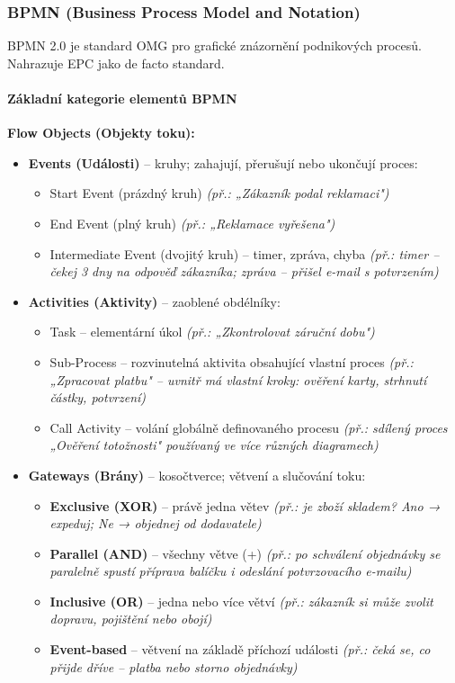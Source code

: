 \subsubsection{BPMN (Business Process Model and Notation)}

BPMN 2.0 je standard OMG pro grafické znázornění podnikových procesů. Nahrazuje EPC jako de facto standard.

\paragraph{Základní kategorie elementů BPMN}

\textbf{Flow Objects (Objekty toku):}
\begin{itemize}
  \item \textbf{Events (Události)} -- kruhy; zahajují, přerušují nebo ukončují proces:
    \begin{itemize}
      \item Start Event (prázdný kruh) \textit{(př.: „Zákazník podal reklamaci")}
      \item End Event (plný kruh) \textit{(př.: „Reklamace vyřešena")}
      \item Intermediate Event (dvojitý kruh) -- timer, zpráva, chyba \textit{(př.: timer -- čekej 3 dny na odpověď zákazníka; zpráva -- přišel e-mail s potvrzením)}
    \end{itemize}
  \item \textbf{Activities (Aktivity)} -- zaoblené obdélníky:
    \begin{itemize}
      \item Task -- elementární úkol \textit{(př.: „Zkontrolovat záruční dobu")}
      \item Sub-Process -- rozvinutelná aktivita obsahující vlastní proces \textit{(př.: „Zpracovat platbu" -- uvnitř má vlastní kroky: ověření karty, strhnutí částky, potvrzení)}
      \item Call Activity -- volání globálně definovaného procesu \textit{(př.: sdílený proces „Ověření totožnosti" používaný ve více různých diagramech)}
    \end{itemize}
  \item \textbf{Gateways (Brány)} -- kosočtverce; větvení a slučování toku:
    \begin{itemize}
      \item \textbf{Exclusive (XOR)} -- právě jedna větev \textit{(př.: je zboží skladem? Ano → expeduj; Ne → objednej od dodavatele)}
      \item \textbf{Parallel (AND)} -- všechny větve (+) \textit{(př.: po schválení objednávky se paralelně spustí příprava balíčku i odeslání potvrzovacího e-mailu)}
      \item \textbf{Inclusive (OR)} -- jedna nebo více větví \textit{(př.: zákazník si může zvolit dopravu, pojištění nebo obojí)}
      \item \textbf{Event-based} -- větvení na základě příchozí události \textit{(př.: čeká se, co přijde dříve -- platba nebo storno objednávky)}
    \end{itemize}
\end{itemize}

